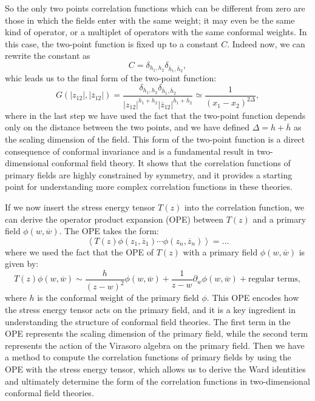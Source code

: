So the only two points correlation functions which can be different from zero are those in which the fields enter with the same weight; it may even be the same kind of operator, or a multiplet of operators with the same conformal weights. In this case, the two-point function is fixed up to a constant $C$. Indeed now, we can rewrite the constant as
\[
    C = \delta_{h_1, h_2} \delta_{\overline{h}_1, \overline{h}_2},
\]
whic leads us to the final form of the two-point function:
\[
    G(\vert z_{12} \vert, \vert \overline{z}_{12} \vert) = \frac{\delta_{h_1, h_2} \delta_{\overline{h}_1, \overline{h}_2}}{\vert z_{12} \vert^{h_1 + h_2} \vert \overline{z}_{12} \vert^{\overline{h}_1 + \overline{h}_2}} \simeq \frac{1}{(x_1-x_2)^{2\Delta}},
\]
where in the last step we have used the fact that the two-point function depends only on the distance between the two points, and we have defined $\Delta = h + \overline{h}$ as the scaling dimension of the field. This form of the two-point function is a direct consequence of conformal invariance and is a fundamental result in two-dimensional conformal field theory. It shows that the correlation functions of primary fields are highly constrained by symmetry, and it provides a starting point for understanding more complex correlation functions in these theories.

If we now insert the stress energy tensor $T(z)$ into the correlation function, we can derive the operator product expansion (OPE) between $T(z)$ and a primary field $\phi(w,\overline{w})$. The OPE takes the form:
\[
    \left\langle T(z) \phi(z_1,\overline{z}_1) \cdots \phi(z_n,\overline{z}_n) \right\rangle =\dots
\]
where we used the fact that the OPE of $T(z)$ with a primary field $\phi(w,\overline{w})$ is given by:
\[
    T(z) \phi(w,\overline{w}) \sim \frac{h}{(z-w)^2} \phi(w,\overline{w}) + \frac{1}{z-w} \partial_w \phi(w,\overline{w}) + \text{regular terms},
\]
where $h$ is the conformal weight of the primary field $\phi$. This OPE encodes how the stress energy tensor acts on the primary field, and it is a key ingredient in understanding the structure of conformal field theories. The first term in the OPE represents the scaling dimension of the primary field, while the second term represents the action of the Virasoro algebra on the primary field. Then we have a method to compute the correlation functions of primary fields by using the OPE with the stress energy tensor, which allows us to derive the Ward identities and ultimately determine the form of the correlation functions in two-dimensional conformal field theories.

